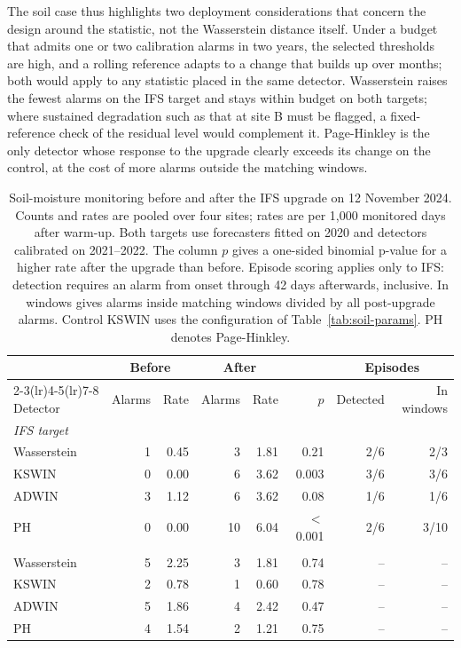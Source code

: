 \documentclass[preprint,12pt]{elsarticle}
\begin{document}
The soil case thus highlights two deployment considerations that concern the design around the statistic, not the Wasserstein distance itself. Under a budget that admits one or two calibration alarms in two years, the selected thresholds are high, and a rolling reference adapts to a change that builds up over months; both would apply to any statistic placed in the same detector. Wasserstein raises the fewest alarms on the IFS target and stays within budget on both targets; where sustained degradation such as that at site B must be flagged, a fixed-reference check of the residual level would complement it. Page-Hinkley is the only detector whose response to the upgrade clearly exceeds its change on the control, at the cost of more alarms outside the matching windows.

\begin{table}[htbp]\centering\small\setlength{\tabcolsep}{4pt}
\caption{Soil-moisture monitoring before and after the IFS upgrade on 12 November 2024. Counts and rates are pooled over four sites; rates are per 1,000 monitored days after warm-up. Both targets use forecasters fitted on 2020 and detectors calibrated on 2021--2022. The column $p$ gives a one-sided binomial p-value for a higher rate after the upgrade than before. Episode scoring applies only to IFS: detection requires an alarm from onset through 42 days afterwards, inclusive. In windows gives alarms inside matching windows divided by all post-upgrade alarms. Control KSWIN uses the configuration of Table~\ref{tab:soil-params}. PH denotes Page-Hinkley.}\label{tab:soil}
\begin{tabular}{lrrrrrrr}
\toprule
& \multicolumn{2}{c}{Before} & \multicolumn{2}{c}{After} & & \multicolumn{2}{c}{Episodes}\\\cmidrule(lr){2-3}\cmidrule(lr){4-5}\cmidrule(lr){7-8}
Detector & Alarms & Rate & Alarms & Rate & $p$ & Detected & In windows\\\midrule
\multicolumn{8}{l}{\textit{IFS target}}\\
Wasserstein & 1 & 0.45 & 3 & 1.81 & 0.21 & 2/6 & 2/3\\
KSWIN & 0 & 0.00 & 6 & 3.62 & 0.003 & 3/6 & 3/6\\
ADWIN & 3 & 1.12 & 6 & 3.62 & 0.08 & 1/6 & 1/6\\
PH & 0 & 0.00 & 10 & 6.04 & $<$0.001 & 2/6 & 3/10\\
\addlinespace
\multicolumn{8}{l}{\textit{ERA5-Land control}}\\
Wasserstein & 5 & 2.25 & 3 & 1.81 & 0.74 & -- & --\\
KSWIN & 2 & 0.78 & 1 & 0.60 & 0.78 & -- & --\\
ADWIN & 5 & 1.86 & 4 & 2.42 & 0.47 & -- & --\\
PH & 4 & 1.54 & 2 & 1.21 & 0.75 & -- & --\\
\bottomrule
\end{tabular}
\end{table}
\end{document}
